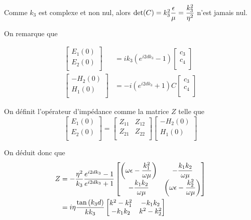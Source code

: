 Comme $k_3$ est complexe et non nul, alors $\det(C) = k_3^2\dfrac{\epsilon}{\mu}=\dfrac{k_3^2}{\eta^2}$ n'est jamais nul.

On remarque que 

\begin{align}
    \begin{bmatrix}
        E_1(0)\\
        E_2(0)\\
    \end{bmatrix}
    & = ik_3\left(e^{i2dk_3} - 1\right)
    \begin{bmatrix}
        c_3 \\
        c_4 \\
    \end{bmatrix}\\
    \begin{bmatrix}
        -H_2(0)\\
        H_1(0)\\
    \end{bmatrix}
    & =  -i\left( e^{i2dk_3} + 1 \right) C
    \begin{bmatrix}
        c_3 \\
        c_4 \\
    \end{bmatrix}
\end{align}

On définit l'opérateur d'impédance comme la matrice $Z$ telle que 
\begin{equation}
    \begin{bmatrix}
        E_1(0)\\
        E_2(0)\\
    \end{bmatrix}
    =
    \begin{bmatrix}
        Z_{11} & Z_{12} \\
        Z_{21} & Z_{22} \\
    \end{bmatrix}
    \begin{bmatrix}
        -H_2(0)\\
        H_1(0)\\
    \end{bmatrix}
\end{equation}

On déduit donc que
\begin{align}
    Z &=  - \dfrac{\eta^2}{k_3}\dfrac{e^{i2dk_3} -1}{e^{i2dk_3} +1}  
        \begin{bmatrix}
           \left(\omega\epsilon-\dfrac{k_1^2}{\omega\mu}\right)  & -\dfrac{k_1k_2}{\omega\mu}\\
            -\dfrac{k_1k_2}{\omega\mu} &  \left(\omega\epsilon-\dfrac{k_2^2}{\omega\mu}\right)
        \end{bmatrix}\\
    &= i\eta\dfrac{\tan\left(k_3d\right)}{kk_3}
        \begin{bmatrix}
           k^2-k_1^2  & -k_1k_2\\
            -k_1k_2 & k^2-k_2^2\\
        \end{bmatrix}
\end{align}

